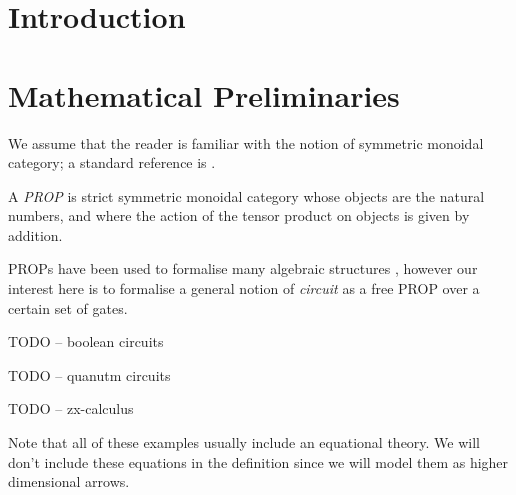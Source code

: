 \documentclass[a4paper]{article}
\begin{document}
\maketitle



\section{Introduction}
\label{sec:intro}

\section{Mathematical Preliminaries}
\label{sec:prelim}

We assume that the reader is familiar with the notion of symmetric
monoidal category; a standard reference is
\cite{MacLane:CatsWM:1971}.  

\begin{definition}\label{def:PROP}
  A \emph{PROP} is strict symmetric monoidal category whose objects
  are the natural numbers, and where the action of the tensor product on
  objects is given by addition.
\end{definition}

PROPs have been used to formalise many algebraic structures
\cite{Lack:2004sf}, however our interest here is to formalise a
general notion of \emph{circuit} as a free PROP over a certain set of
gates.

\begin{example}  \label{ex:boolean-circs}
  TODO -- boolean circuits
\end{example}

\begin{example}  \label{ex:quantum-circs}
  TODO -- quanutm circuits
\end{example}

\begin{example}  \label{ex:zx-calculus}
  TODO -- zx-calculus
\end{example}

\noindent
Note that all of these examples usually include an equational theory.
We will don't include these equations in the  definition since we will
model them as higher dimensional arrows.

\end{document}
